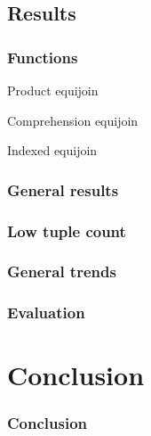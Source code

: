 \documentclass{beamer}
\begin{document}
\subsection{Results}
\begin{frame}
\frametitle{Functions}
\begin{block}{Product equijoin}
    \vspace{-4mm}
    {\scriptsize}
    \vspace{-7mm}
\end{block}\pause
\begin{block}{Comprehension equijoin}
    \vspace{-4mm}
    {\scriptsize}
    \vspace{-7mm}
\end{block}\pause
\begin{block}{Indexed equijoin}
    \vspace{-4mm}
    {\scriptsize}
    \vspace{-7mm}
\end{block}
\end{frame}
\begin{frame}
\end{frame}

\begin{frame}
\frametitle{General results}

\begin{table}[p]
    \centering
    
    \caption{Percentage change of mean time to complete query `join onePercent
        and onePercent' when using indexed equijoin compared to other
    functions.}
    \label{tab:percentage-change-of-means-join-onePercent-and-onePercent}
\end{table}
\end{frame}

\begin{frame}
\frametitle{Low tuple count}

\end{frame}

\begin{frame}
\frametitle{General trends}

\end{frame}

\begin{frame}
\frametitle{Evaluation}
{\footnotesize}
\end{frame}

\section{Conclusion}
\begin{frame}
\frametitle{Conclusion}
\end{frame}
\end{document}
